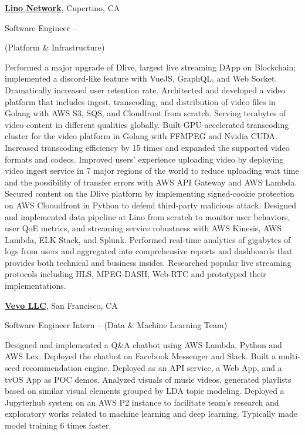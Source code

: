 \documentclass[letterpaper,MMMyyyy,nonstopmode]{simpleresumecv}
\begin{document}
\begin{Body}
\BigGap
\Entry
\href{https://lino.network/}
{\textbf{Lino Network}},
Cupertino, CA

\Gap
\BulletItem
Software Engineer
\hfill
{} --

\newline
(Platform \& Infrastructure)
\begin{Detail}
\SubBulletItem
Performed a major upgrade of Dlive, largest live streaming DApp on Blockchain; implemented a discord-like feature with VueJS, GraphQL, and Web Socket. Dramatically increased user retention rate.
\SubBulletItem
Architected and developed a video platform that includes ingest, transcoding, and distribution of video files in Golang with AWS S3, SQS, and Cloudfront from scratch. Serving terabytes of video content in different qualities globally.
\SubBulletItem
Built GPU-accelerated transcoding cluster for the video platform in Golang with FFMPEG and Nvidia CUDA. Increased transcoding efficiency by 15 times and expanded the supported video formats and codecs.
\SubBulletItem
Improved users' experience uploading video by deploying video ingest service in 7 major regions of the world to reduce uploading wait time and the possibility of transfer errors with AWS API Gateway and AWS Lambda.
\SubBulletItem
Secured content on the Dlive platform by implementing signed-cookie protection on AWS Clooudfront in Python to defend third-party malicious attack.
\SubBulletItem
Designed and implemented data pipeline at Lino from scratch to monitor user behaviors, user QoE metrics, and streaming service robustness with AWS Kinesis, AWS Lambda, ELK Stack, and Splunk. Performed real-time analytics of gigabytes of logs from users and aggregated into comprehensive reports and dashboards that provides both technical and business insides.
\SubBulletItem
Researched popular live streaming protocols including HLS, MPEG-DASH, Web-RTC and prototyped their implementations.
\end{Detail}

\BigGap
\Entry
\href{https://hq.vevo.com/}
{\textbf{Vevo LLC}},
San Francisco, CA

\Gap
\BulletItem
Software Engineer Intern
\hfill
{} --
\newline
(Data \& Machine Learning Team)
\begin{Detail}
\SubBulletItem
Designed and implemented a Q\&A chatbot using AWS Lambda, Python and AWS Lex. Deployed the chatbot on Facebook Messenger and Slack.
\SubBulletItem
Built a multi-seed recommendation engine. Deployed as an API service, a Web App, and a tvOS App as POC demos.
\SubBulletItem
Analyzed visuals of music videos, generated playlists based on similar visual elements grouped by LDA topic modeling.
\SubBulletItem
Deployed a Jupyterhub system on an AWS P2 instance to facilitate team's research and exploratory works related to machine learning and deep learning. Typically made model training 6 times faster.
\end{Detail}


\end{Body}
\end{document}

